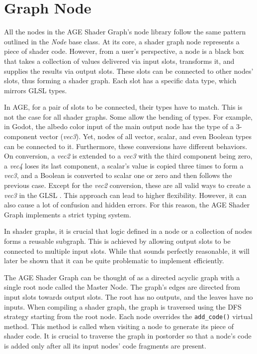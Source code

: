 \documentclass[
  digital,     %
  oneside,     %
  nosansbold,  %
  nocolorbold, %
  lof,         %
  lot,         %
]{fithesis4}
\begin{document}
\section{Graph Node}
All the nodes in the AGE Shader Graph's node library follow the same pattern outlined
in the \textit{Node} base class. At its core, a shader graph node represents a piece of shader code.
However, from a user's perspective, a node is a black box that takes a collection of values delivered via input slots,
transforms it, and supplies the results via output slots. These slots
can be connected to other nodes' slots, thus forming a shader graph. Each slot has a specific
data type, which mirrors GLSL types.

In AGE, for a pair of slots to be connected, their types have to match.
This is not the case for all shader graphs. Some allow the bending of types.
For example, in Godot, the albedo color input of the main output node has the type of a 3-component vector (\textit{vec3}).
Yet, nodes of all vector, scalar, and even Boolean types can be connected to it. Furthermore, these conversions
have different behaviors. On conversion, a \textit{vec2} is extended to a \textit{vec3} with the third component being zero,
a \textit{vec4} loses its last component, a scalar's value is copied three times to form a \textit{vec3}, and a Boolean is converted
to scalar one or zero and then follows the previous case. Except for the \textit{vec2} conversion,
these are all valid ways to create a \textit{vec3} in the GLSL \cite{openglwiki-datatype}.
This approach can lead to higher flexibility. However, it can also cause a lot of confusion and hidden errors.
For this reason, the AGE Shader Graph implements a strict typing system.

In shader graphs, it is crucial that logic defined in a node or a collection of nodes forms a reusable subgraph.
This is achieved by allowing output slots to be connected to multiple input slots.
While that sounds perfectly reasonable, it will later be shown that it can be quite problematic to implement efficiently.

The AGE Shader Graph can be thought of as
a directed acyclic graph with a single root node called the Master Node. The graph's edges are
directed from input slots towards output slots. The root has no outputs, and the leaves have no inputs.
When compiling a shader graph, the graph is traversed using the DFS 
strategy starting from the root node. Each node overrides the \verb|add_code()| virtual method.
This method is called when visiting a node to generate its piece of shader code.
It is crucial to traverse the graph in postorder so that a node's code is added only after all its input nodes'
code fragments are present.
\end{document}
